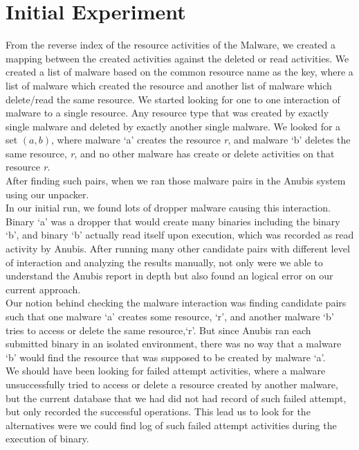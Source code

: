\section{Initial Experiment}
\label{sec:Initial Experiment}
From the reverse index of the resource activities of the Malware, we created a mapping between the created activities against the deleted or read activities.
We created a list of malware based on the common resource name as the key, where a list of malware which created the resource and another list of malware which delete/read the same resource.
We started looking for one to one interaction of malware to a single resource. Any resource type that was created by exactly single malware and deleted by exactly another single malware.
We looked for a set $(a, b)$, where malware `a' creates the resource \emph{r}, and malware `b' deletes the same resource, \emph{r}, and no other malware has create or delete activities on that resource \emph{r}.\\
After finding such pairs, when we ran those malware pairs in the Anubis system using our unpacker.\\
In our initial run, we found lots of dropper malware causing this interaction. Binary `a' was a dropper that would create many binaries including the binary `b', and binary `b' actually read itself upon execution, which was recorded as read activity by Anubis.
After running many other candidate pairs with different level of interaction and analyzing the results manually, not only were we able to understand the Anubis report in depth but also found an logical error on our current approach.\\
Our notion behind checking the malware interaction was finding candidate pairs such that one malware `a' creates some resource, `r', and another malware `b' tries to access or delete the same resource,`r'.
But since Anubis ran each submitted binary in an isolated environment, there was no way that a malware `b' would find the resource that was supposed to be created by malware `a'.\\
We should have been looking for failed attempt activities, where a malware unsuccessfully tried to access or delete a resource created by another malware, but the current database that we had did not had record of such failed attempt, but only recorded the successful operations.
This lead us to look for the alternatives were we could find log of such failed attempt activities during the execution of binary.\\
